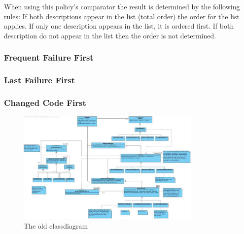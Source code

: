 \documentclass[i2]{oss}
\begin{document}
When using this policy's comparator the result is determined by the 
following rules:
If both descriptions appear in the list (total order) the order for the 
list applies.
If only one description appears in the list, it is ordered first.
If both description do not appear in the list then the order is not 
determined.

\subsubsection{Frequent Failure First}



\subsubsection{Last Failure First}



\subsubsection{Changed Code First}




\begin{figure}[tbp]
\begin{center}
    \includegraphics[width=0.8\textwidth]{klassendiagramOud}
    \caption{The old classdiagram}
	\label{fig:kd-oud}
\end{center}
\end{figure}
\end{document}
